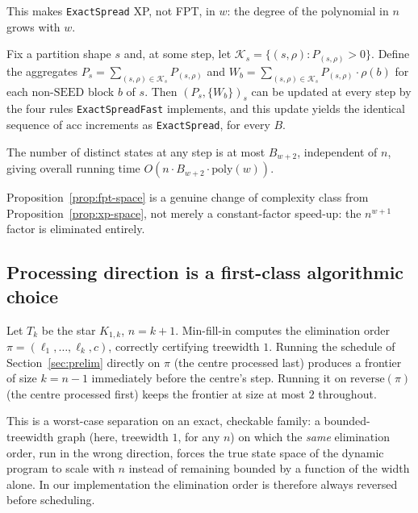 \documentclass[ijoc,sglanonrev]{informs4}
\begin{document}
This makes \texttt{ExactSpread} XP, not FPT, in $w$: the degree of the
polynomial in $n$ grows with $w$.

\begin{theorem}\label{thm:twig-collapse}
Fix a partition shape $s$ and, at some step, let
$\mathcal K_s=\{(s,\rho):P_{(s,\rho)}>0\}$. Define the aggregates
$P_s=\sum_{(s,\rho)\in\mathcal K_s}P_{(s,\rho)}$ and
$W_b=\sum_{(s,\rho)\in\mathcal K_s}P_{(s,\rho)}\cdot\rho(b)$ for each
non-$\mathrm{SEED}$ block $b$ of $s$. Then $(P_s,\{W_b\})_s$ can be updated
at every step by the four rules \texttt{ExactSpreadFast} implements, and
this update yields the identical sequence of $\mathrm{acc}$ increments as
\texttt{ExactSpread}, for every $B$.
\end{theorem}

\begin{proposition}\label{prop:fpt-space}
The number of distinct states at any step is at most $B_{w+2}$, independent
of $n$, giving overall running time $O(n\cdot B_{w+2}\cdot\mathrm{poly}(w))$.
\end{proposition}

Proposition~\ref{prop:fpt-space} is a genuine change of complexity class
from Proposition~\ref{prop:xp-space}, not merely a constant-factor speed-up:
the $n^{w+1}$ factor is eliminated entirely.

\subsection{Processing direction is a first-class algorithmic choice}\label{sec:twig-direction}

\begin{proposition}\label{prop:direction}
Let $T_k$ be the star $K_{1,k}$, $n=k+1$. Min-fill-in computes the
elimination order $\pi=(\ell_1,\dots,\ell_k,c)$, correctly certifying
treewidth $1$. Running the schedule of Section~\ref{sec:prelim} directly on
$\pi$ (the centre processed last) produces a frontier of size $k=n-1$
immediately before the centre's step. Running it on $\mathrm{reverse}(\pi)$
(the centre processed first) keeps the frontier at size at most $2$
throughout.
\end{proposition}

This is a worst-case separation on an exact, checkable family: a
bounded-treewidth graph (here, treewidth $1$, for any $n$) on which the
\emph{same} elimination order, run in the wrong direction, forces the true
state space of the dynamic program to scale with $n$ instead of remaining
bounded by a function of the width alone. In our implementation the
elimination order is therefore always reversed before scheduling.
\end{document}
